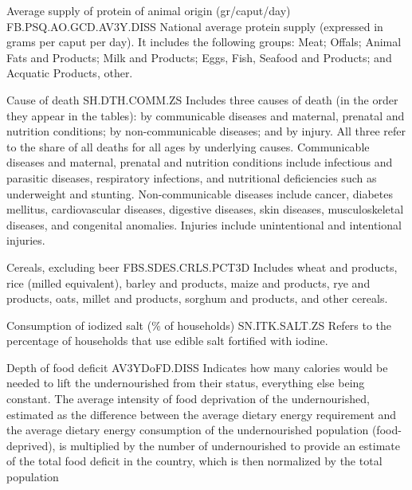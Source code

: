\begin{MetadataCollection}
\begin{metadata}{ Average supply of protein of animal origin (gr/caput/day)}{ FB.PSQ.AO.GCD.AV3Y.DISS }
National average protein supply (expressed in grams per caput per day). It includes the following groups: Meat; Offals; Animal Fats and Products; Milk and Products; Eggs, Fish, Seafood and Products; and Acquatic Products, other. 
\end{metadata}

\begin{metadata}{ Cause of death }{ SH.DTH.COMM.ZS }
Includes three causes of death (in the order they appear in the tables): by communicable diseases and maternal, prenatal and nutrition conditions; by non-communicable diseases; and by injury. All three refer to the share of all deaths for all ages by underlying causes. Communicable diseases and maternal, prenatal and nutrition conditions include infectious and parasitic diseases, respiratory infections, and nutritional deficiencies such as underweight and stunting. Non-communicable diseases include cancer, diabetes mellitus, cardiovascular diseases, digestive diseases, skin diseases, musculoskeletal diseases, and congenital anomalies. Injuries include unintentional and intentional injuries. 
\end{metadata}

\begin{metadata}{ Cereals, excluding beer }{ FBS.SDES.CRLS.PCT3D }
Includes wheat and products, rice (milled equivalent), barley and products, maize and products, rye and products, oats, millet and products, sorghum and products, and other cereals. 
\end{metadata}

\begin{metadata}{ Consumption of iodized salt (\% of households) }{ SN.ITK.SALT.ZS }
Refers to the percentage of households that use edible salt fortified with iodine. 
\end{metadata}

\begin{metadata}{ Depth of food deficit }{ AV3YDoFD.DISS }
Indicates how many calories would be needed to lift the undernourished from their status, everything else being constant. The average intensity of food deprivation of the undernourished, estimated as the difference between the average dietary energy requirement and the average dietary energy consumption of the undernourished population (food-deprived), is multiplied by the number of undernourished to provide an estimate of the total food deficit in the country, which is then normalized by the total population 
\end{metadata}


\end{MetadataCollection}

